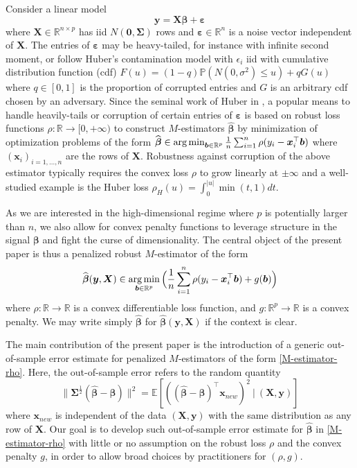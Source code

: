 \documentclass[11pt]{amsart}
\numberwithin{equation}{section}
\numberwithin{equation}{section}
\def\argmin{\mathop{\rm arg\, min}}
\def\argmin{\mathop{\rm arg\, min}}
\def\real{{\mathbb{R}}}
\def\R{{\real}}
\def\E{{\mathbb{E}}}
\def\P{{\mathbb{P}}}
\def\mathbold{\boldsymbol} %
\def\bb{\mathbold{b}}\def\bhat{\widehat{b}}\def\btil{\widetilde{b}}
\def\bx{\mathbold{x}}\def\xhat{\widehat{x}}\def\xtil{\widetilde{x}}\def\xbar{{\overline x}}\def\vbx{{\bf x}}
\def\bX{\mathbold{X}}\def\hbX{{\widehat{\bX}}}\def\tbX{{\widetilde{\bX}}}\def\bXbar{{\overline \bX}}
\def\by{\mathbold{y}}\def\yhat{\widehat{y}}\def\ytil{\widetilde{y}}\def\ybar{{\overline y}}\def\vby{{\bf y}}
\def\bbeta{\mathbold{\beta}}\def\betahat{\widehat{\beta}}\def\hbeta{\widehat{\beta}}
\def\hbbeta{{{\widehat{\bbeta}}}}
\def\ep{\varepsilon}\def\eps{\epsilon}\def\veps{\varepsilon}
\def\bep{ {\mathbold{\ep} }}
\def\bSigma{\mathbold{\Sigma}}\def\hbSigma{{\widehat{\bSigma}}}
\def\argmin{\mathop{\rm arg\, min}}
\begin{document}
Consider a linear model 
\begin{equation}
    \label{LM}
    \by=\bX\bbeta+\bep
\end{equation}
where $\bX\in\R^{n\times p}$ has iid $N({\mathbf 0},\bSigma)$ rows and $\bep\in\R^n$
is a noise vector independent of $\bX$.
The entries of $\bep$ may be heavy-tailed, for instance
with infinite second moment,
or follow Huber's contamination model
with $\eps_i$ iid with cumulative distribution function (cdf)
$F(u) = (1-q)\P(N(0,\sigma^2)\le u) + q G(u)$
where $q\in[0,1]$ is the proportion of corrupted entries
and $G$ is an arbitrary cdf chosen by an adversary.
Since the seminal work of Huber in \cite{huber1964robust},
a popular means to handle heavily-tails
or corruption of certain entries of $\bep$
is based
on robust loss functions $\rho:\R \to [0,+\infty)$ to construct $M$-estimators $\hbbeta$
by minimization of optimization problems of the form
$
    \hbbeta \in \argmin_{\bb\in\R^p}
    \frac 1 n 
    \sum_{i=1}^n \rho(y_i - \bx_i^\top\bb)
$
where $(\bx_i)_{i=1,...,n}$ are the rows of $\bX$.
Robustness against corruption of the above estimator typically
requires the convex loss $\rho$ to grow linearly at $\pm \infty$
and a well-studied example is the Huber loss $\rho_H(u)=\int_0^{|u|}\min(t,1)dt$.

As we are interested in the high-dimensional regime where $p$
is potentially larger than $n$, we also allow for convex penalty functions
to leverage structure
in the signal $\bbeta$ and fight the curse of dimensionality.
The central object of the present paper is thus
a penalized robust $M$-estimator of the form
\begin{equation}
    \label{M-estimator-rho}
    \hbbeta(\by,\bX) \in \argmin_{\bb\in\R^p}
    \Big(
        \frac 1 n 
        \sum_{i=1}^n \rho(y_i - \bx_i^\top\bb)
        + g(\bb)
    \Big)
\end{equation}
where $\rho:\R \to\R$ is a convex differentiable loss function,
and $g:\R^p\to\R$ is a convex penalty.
We may write simply $\hbbeta$ for $\hbbeta(\by,\bX)$
if the context is clear.

The main contribution of the present paper is the introduction
of a generic out-of-sample error estimate for penalized $M$-estimators
of the form \eqref{M-estimator-rho}.
Here, the out-of-sample error refers to the random quantity
\begin{equation}
\|\bSigma^{\frac12}(\hbbeta-\bbeta)\|^2
= \E[((\hbbeta-\bbeta)^\top\bx_{new} )^2 ~ | ~ (\bX,\by)]
\label{MSE}
\end{equation}
where $\bx_{new}$ is independent of the data $(\bX,\by)$ with the
same distribution as any row of $\bX$.
Our goal is to develop such out-of-sample error estimate
for $\hbbeta$ in \eqref{M-estimator-rho}
with little or no assumption on the robust loss $\rho$
and the convex penalty $g$, in order to allow broad choices by practitioners
for $(\rho,g)$.
\end{document}
